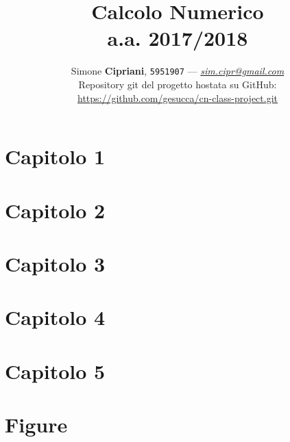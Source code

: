 \documentclass[a4paper, 12pt]{article}
\date{}
\begin{document}
\title{
	\vspace{3cm}
	\textbf{Calcolo Numerico}
	\\
	a.a. 2017/2018
	\vspace{1.5cm}
}

\author{
	Simone \textbf{Cipriani}, \texttt{5951907} --- \href{mailto:sim.cipr@gmail.com}{\textit{sim.cipr@gmail.com}}
	\vspace{1cm}
	\\
	Repository git del progetto hostata su GitHub:
	\\
	\url{https://github.com/gesucca/cn-class-project.git}
}

\maketitle
\newpage
\tableofcontents


\newpage
\section{\textbf{Capitolo 1}}


\newpage
\section{\textbf{Capitolo 2}}


\newpage
\section{\textbf{Capitolo 3}}


\newpage
\section{\textbf{Capitolo 4}}


\newpage
\section{\textbf{Capitolo 5}}


\newpage
{}
\section{\textbf{Figure}}
%
\end{document}
